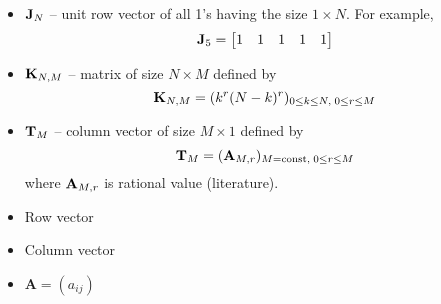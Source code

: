 ﻿\begin{itemize}
    \item ${\mathbf{J}} \sb{N}$ -- unit row vector of all 1's having the size $1 \times N$.
    For example,
    \[
        {\mathbf{J}} \sb{5} =
        \begin{bmatrix}
            1 & 1 & 1 & 1 & 1
        \end{bmatrix}
    \]
    \item ${\mathbf{K}} \sb{N, M}$ -- matrix of size $N \times M$ defined by
    \[
        {\mathbf{K}} \sb{N, M} = (k^r (N-k)^r)_{0 \leq k \leq N, \; 0 \leq r \leq M}
    \]
    \item ${\mathbf{T}} \sb{M}$ -- column vector of size $M \times 1$ defined by
    \[
        {\mathbf{T}} \sb{M} = ({\mathbf{A}} \sb{M,r})_{M=\mathrm{const}, \; 0 \leq r \leq M}
    \]
    where ${\mathbf{A}} \sb{M,r}$ is rational value (literature).
    \item Row vector
    \item Column vector
    \item $\mathbf{A} = (a_{ij})$
\end{itemize}
